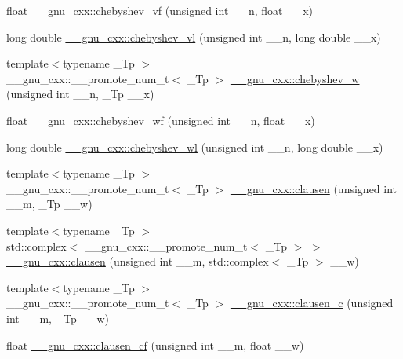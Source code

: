 \begin{DoxyCompactItemize}
\item 
float \hyperlink{group__gnu__math__spec__func_gaa9635a0da4bdeaa8060ae5cf03c3a12d}{\+\_\+\+\_\+gnu\+\_\+cxx\+::chebyshev\+\_\+vf} (unsigned int \+\_\+\+\_\+n, float \+\_\+\+\_\+x)
\item 
long double \hyperlink{group__gnu__math__spec__func_gae387ee1bfcd52555ad4d690f5888a078}{\+\_\+\+\_\+gnu\+\_\+cxx\+::chebyshev\+\_\+vl} (unsigned int \+\_\+\+\_\+n, long double \+\_\+\+\_\+x)
\item 
{\footnotesize template$<$typename \+\_\+\+Tp $>$ }\\\+\_\+\+\_\+gnu\+\_\+cxx\+::\+\_\+\+\_\+promote\+\_\+num\+\_\+t$<$ \+\_\+\+Tp $>$ \hyperlink{group__gnu__math__spec__func_gae283d165c5a058fff7a0f83a2a66b4c2}{\+\_\+\+\_\+gnu\+\_\+cxx\+::chebyshev\+\_\+w} (unsigned int \+\_\+\+\_\+n, \+\_\+\+Tp \+\_\+\+\_\+x)
\item 
float \hyperlink{group__gnu__math__spec__func_gae6d468cee53df584e40afe294127b090}{\+\_\+\+\_\+gnu\+\_\+cxx\+::chebyshev\+\_\+wf} (unsigned int \+\_\+\+\_\+n, float \+\_\+\+\_\+x)
\item 
long double \hyperlink{group__gnu__math__spec__func_ga1297dfd9b9a0f584435de7d83eb9e9c3}{\+\_\+\+\_\+gnu\+\_\+cxx\+::chebyshev\+\_\+wl} (unsigned int \+\_\+\+\_\+n, long double \+\_\+\+\_\+x)
\item 
{\footnotesize template$<$typename \+\_\+\+Tp $>$ }\\\+\_\+\+\_\+gnu\+\_\+cxx\+::\+\_\+\+\_\+promote\+\_\+num\+\_\+t$<$ \+\_\+\+Tp $>$ \hyperlink{group__gnu__math__spec__func_ga5a7016834baf2dd1b57c9dfcfa3436f0}{\+\_\+\+\_\+gnu\+\_\+cxx\+::clausen} (unsigned int \+\_\+\+\_\+m, \+\_\+\+Tp \+\_\+\+\_\+w)
\item 
{\footnotesize template$<$typename \+\_\+\+Tp $>$ }\\std\+::complex$<$ \+\_\+\+\_\+gnu\+\_\+cxx\+::\+\_\+\+\_\+promote\+\_\+num\+\_\+t$<$ \+\_\+\+Tp $>$ $>$ \hyperlink{group__gnu__math__spec__func_ga154f5baa4a7799557b7e7d32dfc73285}{\+\_\+\+\_\+gnu\+\_\+cxx\+::clausen} (unsigned int \+\_\+\+\_\+m, std\+::complex$<$ \+\_\+\+Tp $>$ \+\_\+\+\_\+w)
\item 
{\footnotesize template$<$typename \+\_\+\+Tp $>$ }\\\+\_\+\+\_\+gnu\+\_\+cxx\+::\+\_\+\+\_\+promote\+\_\+num\+\_\+t$<$ \+\_\+\+Tp $>$ \hyperlink{group__gnu__math__spec__func_ga2e89f9758322054738dacf686f6ce974}{\+\_\+\+\_\+gnu\+\_\+cxx\+::clausen\+\_\+c} (unsigned int \+\_\+\+\_\+m, \+\_\+\+Tp \+\_\+\+\_\+w)
\item 
float \hyperlink{group__gnu__math__spec__func_ga515b9b6bca8f97e696ac5be85a44b3bd}{\+\_\+\+\_\+gnu\+\_\+cxx\+::clausen\+\_\+cf} (unsigned int \+\_\+\+\_\+m, float \+\_\+\+\_\+w)

\end{DoxyCompactItemize}
